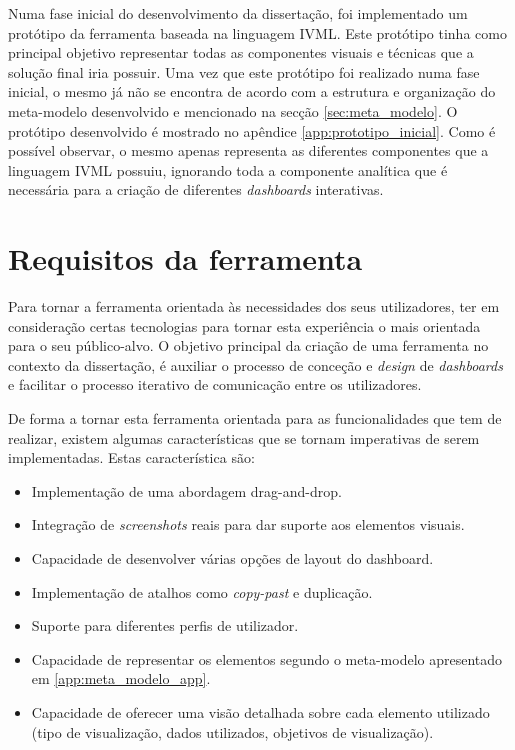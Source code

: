 Numa fase inicial do desenvolvimento da dissertação, foi implementado um protótipo da ferramenta baseada na linguagem \gls{IVML}. Este protótipo tinha como principal objetivo representar todas as componentes visuais e técnicas que a solução final iria possuir. Uma vez que este protótipo foi realizado numa fase inicial, o mesmo já não se encontra de acordo com a estrutura e organização do meta-modelo desenvolvido e mencionado na secção \ref{sec:meta_modelo}. O protótipo desenvolvido é mostrado no apêndice \ref{app:prototipo_inicial}. Como é possível observar, o mesmo apenas representa as diferentes componentes que a linguagem \gls{IVML} possuiu, ignorando toda a componente analítica que é necessária para a criação de diferentes \textit{dashboards} interativas.

\section{Requisitos da ferramenta} %
\label{sec:requisitos}

Para tornar a ferramenta orientada às necessidades dos seus utilizadores, ter em consideração certas tecnologias para tornar esta experiência o mais orientada para o seu público-alvo. O objetivo principal da criação de uma ferramenta no contexto da dissertação, é auxiliar o processo de conceção e \textit{design} de \textit{dashboards} e facilitar o processo iterativo de comunicação entre os utilizadores.

De forma a tornar esta ferramenta orientada para as funcionalidades que tem de realizar, existem algumas características que se tornam imperativas de serem implementadas. Estas característica são:

\begin{itemize}
  \item Implementação de uma abordagem drag-and-drop.
  \item Integração de \textit{screenshots} reais para dar suporte aos elementos visuais.
  \item Capacidade de desenvolver várias opções de layout do dashboard.
  \item Implementação de atalhos como \textit{copy-past} e duplicação.
  \item Suporte para diferentes perfis de utilizador.
  \item Capacidade de representar os elementos segundo o meta-modelo apresentado em \ref{app:meta_modelo_app}.
  \item Capacidade de oferecer uma visão detalhada sobre cada elemento utilizado (tipo de visualização, dados utilizados, objetivos de visualização).
\end{itemize}